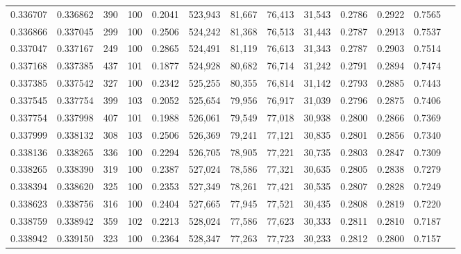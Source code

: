 \begin{tabular}{rrrrrrrrrrrrr}
0.336707 & 0.336862 &   390 & 100 &                                     0.2041 & 523,943 &  81,667 &  76,413 &  31,543 & 0.2786 & 0.2922 & 0.7565 \\
0.336866 & 0.337045 &   299 & 100 &                                     0.2506 & 524,242 &  81,368 &  76,513 &  31,443 & 0.2787 & 0.2913 & 0.7537 \\
0.337047 & 0.337167 &   249 & 100 &                                     0.2865 & 524,491 &  81,119 &  76,613 &  31,343 & 0.2787 & 0.2903 & 0.7514 \\
0.337168 & 0.337385 &   437 & 101 &                                     0.1877 & 524,928 &  80,682 &  76,714 &  31,242 & 0.2791 & 0.2894 & 0.7474 \\
0.337385 & 0.337542 &   327 & 100 &                                     0.2342 & 525,255 &  80,355 &  76,814 &  31,142 & 0.2793 & 0.2885 & 0.7443 \\
0.337545 & 0.337754 &   399 & 103 &                                     0.2052 & 525,654 &  79,956 &  76,917 &  31,039 & 0.2796 & 0.2875 & 0.7406 \\
0.337754 & 0.337998 &   407 & 101 &                                     0.1988 & 526,061 &  79,549 &  77,018 &  30,938 & 0.2800 & 0.2866 & 0.7369 \\
0.337999 & 0.338132 &   308 & 103 &                                     0.2506 & 526,369 &  79,241 &  77,121 &  30,835 & 0.2801 & 0.2856 & 0.7340 \\
0.338136 & 0.338265 &   336 & 100 &                                     0.2294 & 526,705 &  78,905 &  77,221 &  30,735 & 0.2803 & 0.2847 & 0.7309 \\
0.338265 & 0.338390 &   319 & 100 &                                     0.2387 & 527,024 &  78,586 &  77,321 &  30,635 & 0.2805 & 0.2838 & 0.7279 \\
0.338394 & 0.338620 &   325 & 100 &                                     0.2353 & 527,349 &  78,261 &  77,421 &  30,535 & 0.2807 & 0.2828 & 0.7249 \\
0.338623 & 0.338756 &   316 & 100 &                                     0.2404 & 527,665 &  77,945 &  77,521 &  30,435 & 0.2808 & 0.2819 & 0.7220 \\
0.338759 & 0.338942 &   359 & 102 &                                     0.2213 & 528,024 &  77,586 &  77,623 &  30,333 & 0.2811 & 0.2810 & 0.7187 \\
0.338942 & 0.339150 &   323 & 100 &                                     0.2364 & 528,347 &  77,263 &  77,723 &  30,233 & 0.2812 & 0.2800 & 0.7157 \\

\end{tabular}
